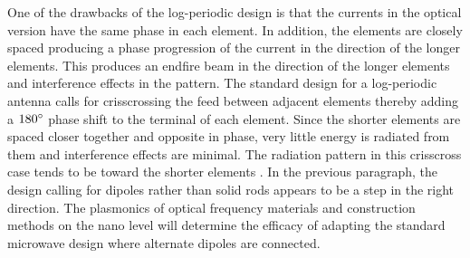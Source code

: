 \documentclass[11pt]{article}
\begin{document}
One of the drawbacks of the log-periodic design is that the currents in the optical version have the same phase in each element. In addition, the elements are closely spaced producing a phase progression of the current in the direction of the longer elements. This produces an endfire beam in the direction of the longer elements and interference effects in the pattern. The standard design for a log-periodic antenna calls for crisscrossing the feed between adjacent elements thereby adding a $180\degree$ phase shift to the terminal of each element. Since the shorter elements are spaced closer together and opposite in phase, very little energy is radiated from them and interference effects are minimal. The radiation pattern in this crisscross case tends to be toward the shorter elements \cite{Balanis2015}. In the previous paragraph, the design calling for dipoles rather than solid rods appears to be a step in the right direction. The plasmonics of optical frequency materials and construction methods on the nano level will determine the efficacy of adapting the standard microwave design where alternate dipoles are connected.
%
\end{document}
